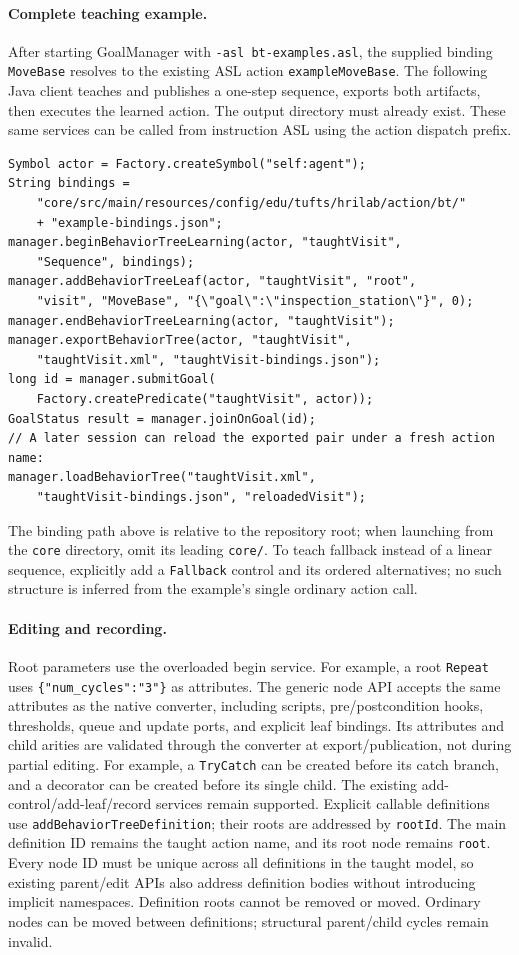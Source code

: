 \paragraph{Complete teaching example.}
After starting GoalManager with \texttt{-asl bt-examples.asl}, the supplied
binding \texttt{MoveBase} resolves to the existing ASL action
\texttt{exampleMoveBase}. The following Java client teaches and publishes a
one-step sequence, exports both artifacts, then executes the learned action.
The output directory must already exist. These same services can be called
from instruction ASL using the action dispatch prefix.
\begin{verbatim}
Symbol actor = Factory.createSymbol("self:agent");
String bindings =
    "core/src/main/resources/config/edu/tufts/hrilab/action/bt/"
    + "example-bindings.json";
manager.beginBehaviorTreeLearning(actor, "taughtVisit",
    "Sequence", bindings);
manager.addBehaviorTreeLeaf(actor, "taughtVisit", "root",
    "visit", "MoveBase", "{\"goal\":\"inspection_station\"}", 0);
manager.endBehaviorTreeLearning(actor, "taughtVisit");
manager.exportBehaviorTree(actor, "taughtVisit",
    "taughtVisit.xml", "taughtVisit-bindings.json");
long id = manager.submitGoal(
    Factory.createPredicate("taughtVisit", actor));
GoalStatus result = manager.joinOnGoal(id);
// A later session can reload the exported pair under a fresh action name:
manager.loadBehaviorTree("taughtVisit.xml",
    "taughtVisit-bindings.json", "reloadedVisit");
\end{verbatim}
The binding path above is relative to the repository root; when launching
from the \texttt{core} directory, omit its leading \texttt{core/}.
To teach fallback instead of a linear sequence, explicitly add a
\texttt{Fallback} control and its ordered alternatives; no such structure is
inferred from the example's single ordinary action call.

\paragraph{Editing and recording.}
Root parameters use the overloaded begin service. For example, a root
\texttt{Repeat} uses \texttt{\{"num\_cycles":"3"\}} as attributes.
The generic node API accepts the same attributes as the native converter,
including scripts, pre/postcondition hooks, thresholds, queue and update ports,
and explicit leaf bindings. Its attributes and child arities are validated
through the converter at export/publication, not during partial editing.
For example, a \texttt{TryCatch} can be created before its catch branch, and
a decorator can be created before its single child.
The existing add-control/add-leaf/record services remain supported.
Explicit callable definitions use \texttt{addBehaviorTreeDefinition}; their roots
are addressed by \texttt{rootId}. The main definition ID remains the taught action
name, and its root node remains \texttt{root}. Every node ID must be unique across
all definitions in the taught model, so existing parent/edit APIs also address
definition bodies without introducing implicit namespaces.
Definition roots cannot be removed or moved. Ordinary nodes can be moved between
definitions; structural parent/child cycles remain invalid.

